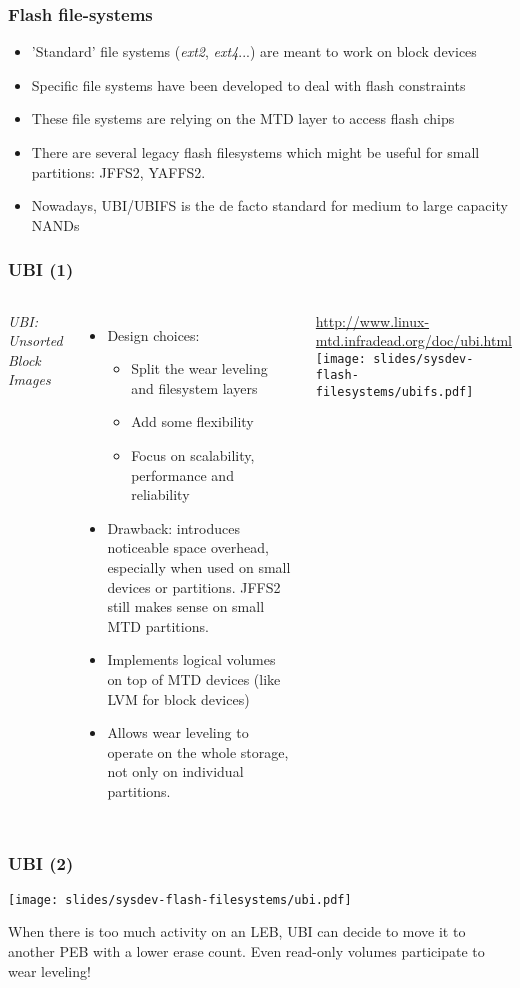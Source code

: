 \begin{frame}
  \frametitle{Flash file-systems}
  \begin{itemize}
  \item 'Standard' file systems ({\em ext2}, {\em ext4}...) are
        meant to work on block devices
  \item Specific file systems have been developed to deal with
        flash constraints
  \item These file systems are relying on the MTD layer to access
    flash chips
  \item There are several legacy flash filesystems which might be
    useful for small partitions: JFFS2, YAFFS2.
  \item Nowadays, UBI/UBIFS is the de facto standard for medium to
    large capacity NANDs
  \end{itemize}
\end{frame}

\begin{frame}
  \frametitle{UBI (1)}
  \begin{columns}
    {\em UBI: Unsorted Block Images}
    \begin{itemize}
    \item Design choices:
      \begin{itemize}
      \item Split the wear leveling and filesystem layers
      \item Add some flexibility
      \item Focus on scalability, performance and reliability
      \end{itemize}
    \item Drawback: introduces noticeable space overhead,
          especially when used on small devices or partitions. JFFS2
          still makes sense on small MTD partitions.
    \item Implements logical volumes on top of MTD devices
          (like LVM for block devices)
    \item Allows wear leveling to operate on the whole storage,
	  not only on individual partitions.
    \end{itemize}
    \url{http://www.linux-mtd.infradead.org/doc/ubi.html}
    \texttt{[image: slides/sysdev-flash-filesystems/ubifs.pdf]}
  \end{columns}
\end{frame}

\begin{frame}
  \frametitle{UBI (2)}
  \begin{center}
    \texttt{[image: slides/sysdev-flash-filesystems/ubi.pdf]}
  \end{center}
  When there is too much activity on an LEB, UBI can decide to move it
  to another PEB with a lower erase count. Even read-only volumes
  participate to wear leveling!
\end{frame}

